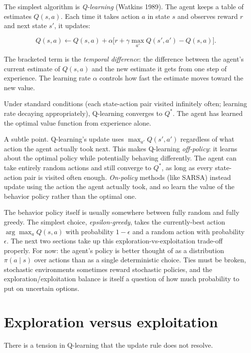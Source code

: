 The simplest algorithm is \emph{Q-learning} (Watkins 1989). The agent keeps a table of estimates $Q(s, a)$. Each time it takes action $a$ in state $s$ and observes reward $r$ and next state $s'$, it updates:

$$Q(s, a) \leftarrow Q(s, a) + \alpha \big[r + \gamma \max_{a'} Q(s', a') - Q(s, a)\big].$$

The bracketed term is the \emph{temporal difference}: the difference between the agent's current estimate of $Q(s, a)$ and the new estimate it gets from one step of experience. The learning rate $\alpha$ controls how fast the estimate moves toward the new value.

Under standard conditions (each state-action pair visited infinitely often; learning rate decaying appropriately), Q-learning converges to $Q^*$. The agent has learned the optimal value function from experience alone.

A subtle point. Q-learning's update uses $\max_{a'} Q(s', a')$ regardless of what action the agent actually took next. This makes Q-learning \emph{off-policy}: it learns about the optimal policy while potentially behaving differently. The agent can take entirely random actions and still converge to $Q^*$, as long as every state-action pair is visited often enough. \emph{On-policy} methods (like SARSA) instead update using the action the agent actually took, and so learn the value of the behavior policy rather than the optimal one.

The behavior policy itself is usually somewhere between fully random and fully greedy. The simplest choice, \emph{epsilon-greedy}, takes the currently-best action $\arg\max_a Q(s, a)$ with probability $1 - \epsilon$ and a random action with probability $\epsilon$. The next two sections take up this exploration-vs-exploitation trade-off properly. For now: the agent's policy is better thought of as a distribution $\pi(a \mid s)$ over actions than as a single deterministic choice. Ties must be broken, stochastic environments sometimes reward stochastic policies, and the exploration/exploitation balance is itself a question of how much probability to put on uncertain options.

\section*{Exploration versus exploitation}

There is a tension in Q-learning that the update rule does not resolve.

